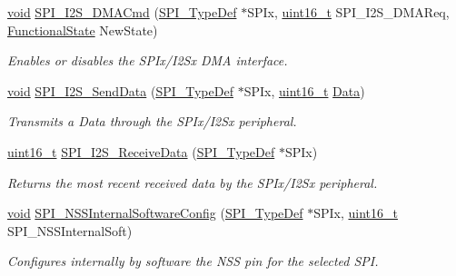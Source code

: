 \begin{DoxyCompactItemize}
\hyperlink{group___n_a_m_e_ga18028b8badbf1ea7e704ccac3c488e82}{void} \hyperlink{group___s_p_i___private___functions_gabed5b91a8576e6d578f364cc0e807e4a}{S\-P\-I\-\_\-\-I2\-S\-\_\-\-D\-M\-A\-Cmd} (\hyperlink{struct_s_p_i___type_def}{S\-P\-I\-\_\-\-Type\-Def} $\ast$S\-P\-Ix, \hyperlink{stdint_8h_a273cf69d639a59973b6019625df33e30}{uint16\-\_\-t} S\-P\-I\-\_\-\-I2\-S\-\_\-\-D\-M\-A\-Req, \hyperlink{group___exported__types_gac9a7e9a35d2513ec15c3b537aaa4fba1}{Functional\-State} New\-State)
\begin{DoxyCompactList}\small\item\em Enables or disables the S\-P\-Ix/\-I2\-Sx D\-M\-A interface. \end{DoxyCompactList}\item 
\hyperlink{group___n_a_m_e_ga18028b8badbf1ea7e704ccac3c488e82}{void} \hyperlink{group___s_p_i___private___functions_gad5af40bebe8dbe3fa8bd476489d7e3da}{S\-P\-I\-\_\-\-I2\-S\-\_\-\-Send\-Data} (\hyperlink{struct_s_p_i___type_def}{S\-P\-I\-\_\-\-Type\-Def} $\ast$S\-P\-Ix, \hyperlink{stdint_8h_a273cf69d639a59973b6019625df33e30}{uint16\-\_\-t} \hyperlink{group___copter_control_b_l_ga6f3335509cc4943e20df66f72483910c}{Data})
\begin{DoxyCompactList}\small\item\em Transmits a Data through the S\-P\-Ix/\-I2\-Sx peripheral. \end{DoxyCompactList}\item 
\hyperlink{stdint_8h_a273cf69d639a59973b6019625df33e30}{uint16\-\_\-t} \hyperlink{group___s_p_i___private___functions_gab77de76547f3bff403236b263b070a30}{S\-P\-I\-\_\-\-I2\-S\-\_\-\-Receive\-Data} (\hyperlink{struct_s_p_i___type_def}{S\-P\-I\-\_\-\-Type\-Def} $\ast$S\-P\-Ix)
\begin{DoxyCompactList}\small\item\em Returns the most recent received data by the S\-P\-Ix/\-I2\-Sx peripheral. \end{DoxyCompactList}\item 
\hyperlink{group___n_a_m_e_ga18028b8badbf1ea7e704ccac3c488e82}{void} \hyperlink{group___s_p_i___private___functions_ga56fc508a482f032f9eb80e4c63184126}{S\-P\-I\-\_\-\-N\-S\-S\-Internal\-Software\-Config} (\hyperlink{struct_s_p_i___type_def}{S\-P\-I\-\_\-\-Type\-Def} $\ast$S\-P\-Ix, \hyperlink{stdint_8h_a273cf69d639a59973b6019625df33e30}{uint16\-\_\-t} S\-P\-I\-\_\-\-N\-S\-S\-Internal\-Soft)
\begin{DoxyCompactList}\small\item\em Configures internally by software the N\-S\-S pin for the selected S\-P\-I. \end{DoxyCompactList}\item 

\end{DoxyCompactItemize}

